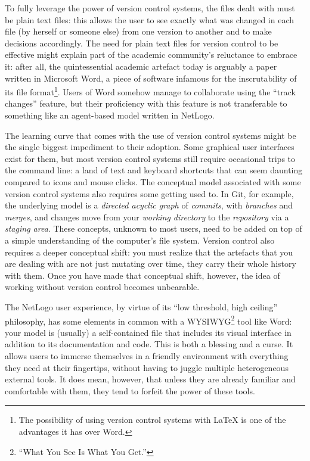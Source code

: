 \documentclass[runningheads]{llncs}
\begin{document}
To fully leverage the power of version control systems, the files dealt with must be plain text files: this allows the user to see exactly what was changed in each file (by herself or someone else) from one version to another and to make decisions accordingly. The need for plain text files for version control to be effective might explain part of the academic community's reluctance to embrace it: after all, the quintessential academic artefact today is arguably a paper written in Microsoft Word, a piece of software infamous for the inscrutability of its file format\footnote{The possibility of using version control systems with \LaTeX{} is one of the advantages it has over Word.}. Users of Word somehow manage to collaborate using the ``track changes'' feature, but their proficiency with this feature is not transferable to something like an agent-based model written in NetLogo.

The learning curve that comes with the use of version control systems might be the single biggest impediment to their adoption. Some graphical user interfaces exist for them, but most version control systems still require occasional trips to the command line: a land of text and keyboard shortcuts that can seem daunting compared to icons and mouse clicks. The conceptual model associated with some version control systems also requires some getting used to. In Git, for example, the underlying model is a \emph{directed acyclic graph} of \emph{commits}, with \emph{branches} and \emph{merges}, and changes move from your \emph{working directory} to the \emph{repository} via a \emph{staging area}. These concepts, unknown to most users, need to be added on top of a simple understanding of the computer's file system. Version control also requires a deeper conceptual shift: you must realize that the artefacts that you are dealing with are not just mutating over time, they carry their whole history with them. Once you have made that conceptual shift, however, the idea of working without version control becomes unbearable.

The NetLogo user experience, by virtue of its ``low threshold, high ceiling'' philosophy, has some elements in common with a WYSIWYG\footnote{``What You See Is What You Get.''} tool like Word: your model is (usually) a self-contained file that includes its visual interface in addition to its documentation and code. This is both a blessing and a curse. It allows users to immerse themselves in a friendly environment with everything they need at their fingertips, without having to juggle multiple heterogeneous external tools. It does mean, however, that unless they are already familiar and comfortable with them, they tend to forfeit the power of these tools.
\end{document}
